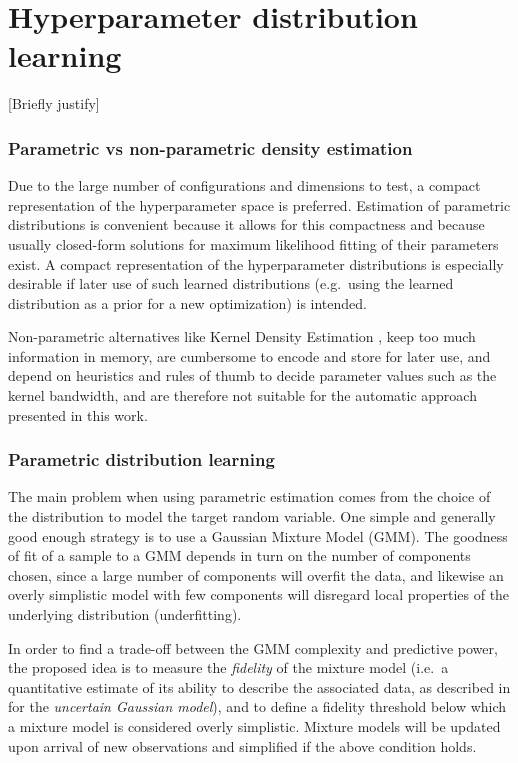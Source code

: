 \chapter{Hyperparameter distribution learning}
	\label{ch:learn}
	[Briefly justify]


	\subsection{Parametric vs non-parametric density estimation}

	Due to the large number of configurations and dimensions to test, a compact representation of
	the hyperparameter space is preferred. Estimation of parametric distributions is convenient
	because it allows for this compactness and because usually closed-form solutions for maximum
	likelihood fitting of their parameters exist. A compact representation of the hyperparameter
	distributions is especially desirable if later use of such learned distributions (e.g.~using the
	learned distribution as a prior for a new optimization) is intended.
	
	Non-parametric alternatives like Kernel Density Estimation
	\cite{rosenblatt1956kde}, \cite{parzen1962kde} keep too much information in memory, are cumbersome to
	encode and store for later use, and depend on heuristics and rules of thumb to decide parameter
	values such as the kernel bandwidth, and are therefore not suitable for the automatic approach
	presented in this work.

	\subsection{Parametric distribution learning}

	The main problem when using parametric estimation comes from the choice of the distribution to
	model the target random variable. One simple and generally good enough strategy is to use a
	Gaussian Mixture Model (GMM). The goodness of fit of a sample to a GMM depends in turn on the
	number of components chosen, since a large number of components will overfit the data, and
	likewise an overly simplistic model with few components will disregard local properties of the
	underlying distribution (underfitting).

	In order to find a trade-off between the GMM complexity and predictive power, the proposed idea
	is to measure the \emph{fidelity} of the mixture model (i.e.~a quantitative estimate of its
	ability to describe the associated data, as described in \cite{declercq2007online,
	declercq2008online} for the \emph{uncertain Gaussian model}), and to define a fidelity threshold
	below which a mixture model is considered overly simplistic. Mixture models will be updated upon
	arrival of new observations and simplified if the above condition holds.

